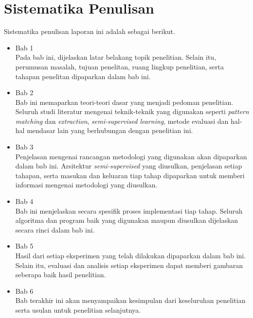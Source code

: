 \section{Sistematika Penulisan}
Sistematika penulisan laporan ini adalah sebagai berikut.
\begin{itemize}
	\item Bab 1 \babSatu \\
	Pada bab ini, dijelaskan latar belakang topik penelitian. Selain itu, perumusan masalah, tujuan penelitan, ruang lingkup penelitian, serta tahapan penelitan dipaparkan dalam bab ini.
	\item Bab 2 \babDua \\
	Bab ini memaparkan teori-teori dasar yang menjadi pedoman penelitian. Seluruh studi literatur mengenai teknik-teknik yang digunakan seperti \textit{pattern matching} dan \textit{extraction}, \textit{semi-supervised learning}, metode evaluasi dan hal-hal mendasar lain yang berhubungan dengan penelitian ini.
	\item Bab 3 \babTiga \\
	Penjelasan mengenai rancangan metodologi yang digunakan akan dipaparkan dalam bab ini. Arsitektur \textit{semi-supervised} yang diusulkan, penjelasan setiap tahapan, serta masukan dan keluaran tiap tahap dipaparkan untuk memberi informasi mengenai metodologi yang diusulkan.
	\item Bab 4 \babEmpat \\
	Bab ini menjelaskan secara spesifik proses implementasi tiap tahap. Seluruh algoritma dan program baik yang digunakan maupun diusulkan dijelaskan secara rinci dalam bab ini.
	\item Bab 5 \babLima \\
	Hasil dari setiap eksperimen yang telah dilakukan dipaparkan dalam bab ini. Selain itu, evaluasi dan analisis setiap eksperimen dapat memberi gambaran seberapa baik hasil penelitian.
	\item Bab 6 \babEnam \\
	Bab terakhir ini akan menyampaikan kesimpulan dari keseluruhan penelitian serta usulan untuk penelitian selanjutnya.
\end{itemize}
